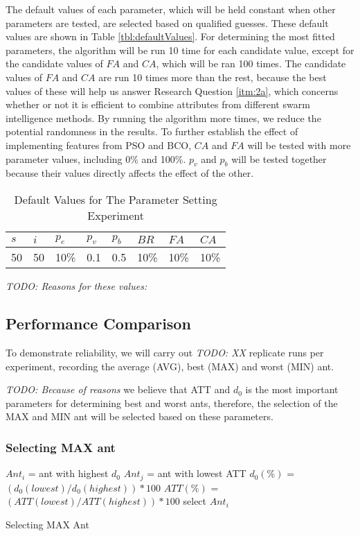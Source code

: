 The default values of each parameter, which will be held constant when other parameters are tested, are selected based on qualified guesses. These default values are shown in Table \vref{tbl:defaultValues}. For determining the most fitted parameters, the algorithm will be run 10 time for each candidate value, except for the candidate values of $FA$ and $CA$, which will be ran 100 times. The candidate values of $FA$ and $CA$ are run 10 times more than the rest, because the best values of these will help us answer Research Question \vref{itm:2a}, which concerns whether or not it is efficient to combine attributes from different swarm intelligence methods. By running the algorithm more times, we reduce the potential randomness in the results. To further establish the effect of implementing features from PSO and BCO, $CA$ and $FA$ will be tested with more parameter values, including 0\% and 100\%. $p_{v}$ and $p_{b}$ will be tested together because their values directly affects the effect of the other. 

\begin{table}[H]
\label{tbl:defaultValues}
	\centering
    \begin{tabular}{|l|l|l|l|l|l|l|l|}
 	\hline
 	$s$ & $i$ & $p_{e}$ & $p_{v}$ & $p_{b}$ & $BR$  & $FA$ & $CA$  \\
 	\hline
    50 & 50 & 10\% & 0.1 & 0.5 & 10\% & 10\%  & 10\%  \\
	\hline
    \end{tabular}
    \caption {Default Values for The Parameter Setting Experiment} \emph{\color{blue} TODO: Reasons for these values:}
    \label{table:parameter_startvalues}
	\end{table}

\subsection{Performance Comparison}

To demonstrate reliability, we will carry out \emph{\color{blue} TODO: XX } replicate runs per experiment, recording the average (AVG), best (MAX) and worst (MIN) ant.  

\emph{\color{blue} TODO: Because of reasons }we believe that ATT and $d_0$ is the most important parameters for determining best and worst ants, therefore, the selection of the MAX and MIN ant will be selected based on these parameters. 

\subsubsection{Selecting MAX ant}
\begin{algorithm}[H]
$Ant_{i}$ = ant with highest $d_0$\;
$Ant_{j}$ = ant with lowest ATT\;
{
	$d_0(\%)$ = $(d_0(lowest) / d_0(highest))*100$\;
	$ATT(\%)$ = $(ATT(lowest) / ATT(highest))*100$\;
	{
		select $Ant_{i}$
	}
}
 \caption{Selecting MAX Ant}
\end{algorithm}


